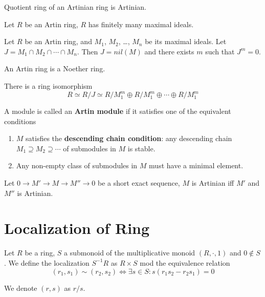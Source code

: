 \documentclass[12pt]{book}
\begin{document}
	\begin{theorem}
		Quotient ring of an Artinian ring is Artinian.
	\end{theorem}
	
	\begin{lemma}
		Let $R$ be an Artin ring, $R$ has finitely many maximal ideals.
	\end{lemma}
	
	\begin{lemma}
		Let $R$ be an Artin ring, and $M_1$, $M_2$, \dots, $M_n$ be its maximal ideals. Let $J=M_1\cap M_2\cap \cdots \cap M_n$. Then $J=nil(M)$ and there exists $m$ such that $J^m=0$.
	\end{lemma}
	
	\begin{theorem}
		An Artin ring is a Noether ring.
	\end{theorem}
	
	\begin{corollary}
		There is a ring isomorphism
		\begin{equation}
			R\simeq R/J \simeq R/M_1^m \oplus R/M_1^m \oplus \cdots \oplus R/M_1^m
		\end{equation}
	\end{corollary}
	
	\begin{definition}
		A module is called an {\bf Artin module} if it satisfies one of the equivalent conditions
		\begin{enumerate}
			\item $M$ satisfies the {\bf descending chain condition}: any descending chain $M_1\supseteq M_2\supseteq \cdots$ of submodules in $M$ is stable.
			\item Any non-empty class of submodules in $M$ must have a minimal element.
		\end{enumerate}
	\end{definition}
	
	\begin{theorem}
		Let $0\rightarrow M' \rightarrow M\rightarrow M''\rightarrow0$ be a short exact sequence, $M$ is Artinian iff $M'$ and $M''$ is Artinian.
	\end{theorem}
	
	\section{Localization of Ring}
		
	\begin{definition}
		Let $R$ be a ring, $S$ a submonoid of the multiplicative monoid $(R,\cdot,1)$ and $0\notin S$. We define the localization $S^{-1}R$ as $R\times S$ mod the equivalence relation
		\begin{equation}
			(r_1,s_1)\sim (r_2,s_2) \iff \exists s\in S: s(r_1s_2-r_2s_1)=0
		\end{equation}
		
		We denote $(r,s)$ as $r/s$.
	\end{definition}
		
\end{document}
